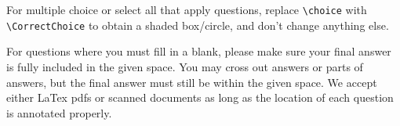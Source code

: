 \documentclass[11pt,addpoints,answers]{exam}
\numberwithin{equation}{section} %
\numberwithin{figure}{section} %
\numberwithin{table}{section} %
\begin{document}
For multiple choice or select all that apply questions, replace \lstinline{\choice} with \lstinline{\CorrectChoice} to obtain a shaded box/circle, and don't change anything else.


For questions where you must fill in a blank, please make sure your final answer is fully included in the given space. You may cross out answers or parts of answers, but the final answer must still be within the given space. We accept either LaTex pdfs or scanned documents as long as the location of each question is annotated properly.









\end{document}
